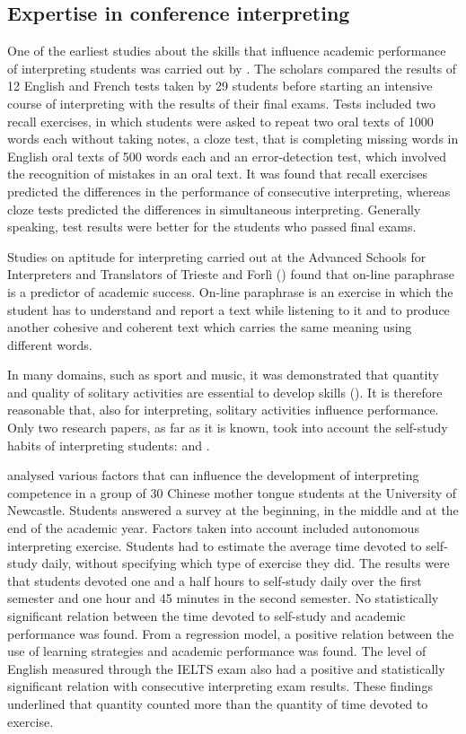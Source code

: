 \documentclass[output=paper]{../langscibook}
\begin{document}
\subsection{Expertise in conference interpreting}
\label{sec:ghiselli:2.2}


One of the earliest studies about the skills that influence academic performance of interpreting students was carried out by \citet{GerverEtAl1984}. The scholars compared the results of 12 English and French tests taken by 29 students before starting an intensive course of interpreting with the results of their final exams. Tests included two recall exercises, in which students were asked to repeat two oral texts of 1000 words each without taking notes, a cloze test, that is completing missing words in English oral texts of 500 words each and an error-detection test, which involved the recognition of mistakes in an oral text. It was found that recall exercises predicted the differences in the performance of consecutive interpreting, whereas cloze tests predicted the differences in simultaneous interpreting. Generally speaking, test results were better for the students who passed final exams.

Studies on aptitude for interpreting carried out at the Advanced Schools for Interpreters and Translators of Trieste and Forlì (\citealt{PippaRusso2002,RussoPippa2004,Russo2014}) found that on-line paraphrase is a predictor of academic success. On-line paraphrase is an exercise in which the student has to understand and report a text while listening to it and to produce another cohesive and coherent text which carries the same meaning using different words.

In many domains, such as sport and music, it was demonstrated that quantity and quality of solitary activities are essential to develop skills (\citealt{Ericsson1996,Ericsson2001,Ericsson2002,HelsenEtAl1998}). It is therefore reasonable that, also for interpreting, solitary activities influence performance. Only two research papers, as far as it is known, took into account the self-study habits of interpreting students: \citet{Fan2012} and \citet{Wang2016}.

\citet{Fan2012} analysed various factors that can influence the development of interpreting competence in a group of 30 Chinese mother tongue students at the University of Newcastle. Students answered a survey at the beginning, in the middle and at the end of the academic year. Factors taken into account included autonomous interpreting exercise. Students had to estimate the average time devoted to self-study daily, without specifying which type of exercise they did. The results were that students devoted one and a half hours to self-study daily over the first semester and one hour and 45 minutes in the second semester. No statistically significant relation between the time devoted to self-study and academic performance was found. From a regression model, a positive relation between the use of learning strategies and academic performance was found. The level of English measured through the IELTS exam also had a positive and statistically significant relation with consecutive interpreting exam results. These findings underlined that quantity counted more than the quantity of time devoted to exercise.
\end{document}
